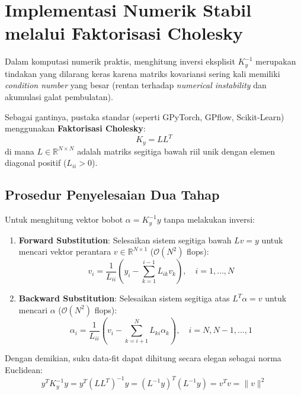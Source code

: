 \documentclass[11pt,a4paper]{article}
\def\boldsymbol#1{#1}%
\def\mathbf#1{#1}%
\begin{document}
\section{Implementasi Numerik Stabil melalui Faktorisasi Cholesky}
\label{sec:cholesky}

Dalam komputasi numerik praktis, menghitung inversi eksplisit $K_y^{-1}$ merupakan tindakan yang dilarang keras karena matriks kovariansi sering kali memiliki \textit{condition number} yang besar (rentan terhadap \textit{numerical instability} dan akumulasi galat pembulatan).

Sebagai gantinya, pustaka standar (seperti GPyTorch, GPflow, Scikit-Learn) menggunakan \textbf{Faktorisasi Cholesky}:
\begin{equation}
K_y = L L^T
\end{equation}
di mana $L \in \mathbb{R}^{N \times N}$ adalah matriks segitiga bawah riil unik dengan elemen diagonal positif ($L_{ii} > 0$).

\subsection{Prosedur Penyelesaian Dua Tahap}
Untuk menghitung vektor bobot $\boldsymbol{\alpha} = K_y^{-1}\mathbf{y}$ tanpa melakukan inversi:
\begin{enumerate}
    \item \textbf{Forward Substitution}: Selesaikan sistem segitiga bawah $L \mathbf{v} = \mathbf{y}$ untuk mencari vektor perantara $\mathbf{v} \in \mathbb{R}^{N \times 1}$ ($\mathcal{O}(N^2)$ flops):
    \begin{equation}
    v_i = \frac{1}{L_{ii}} \left( y_i - \sum_{k=1}^{i-1} L_{ik} v_k \right), \quad i = 1, \dots, N
    \end{equation}
    \item \textbf{Backward Substitution}: Selesaikan sistem segitiga atas $L^T \boldsymbol{\alpha} = \mathbf{v}$ untuk mencari $\boldsymbol{\alpha}$ ($\mathcal{O}(N^2)$ flops):
    \begin{equation}
    \alpha_i = \frac{1}{L_{ii}} \left( v_i - \sum_{k=i+1}^N L_{ki} \alpha_k \right), \quad i = N, N-1, \dots, 1
    \end{equation}
\end{enumerate}

Dengan demikian, suku data-fit dapat dihitung secara elegan sebagai norma Euclidean:
\begin{equation}
\mathbf{y}^T K_y^{-1} \mathbf{y} = \mathbf{y}^T (L L^T)^{-1} \mathbf{y} = (L^{-1}\mathbf{y})^T (L^{-1}\mathbf{y}) = \mathbf{v}^T \mathbf{v} = \|\mathbf{v}\|^2
\end{equation}
\end{document}
